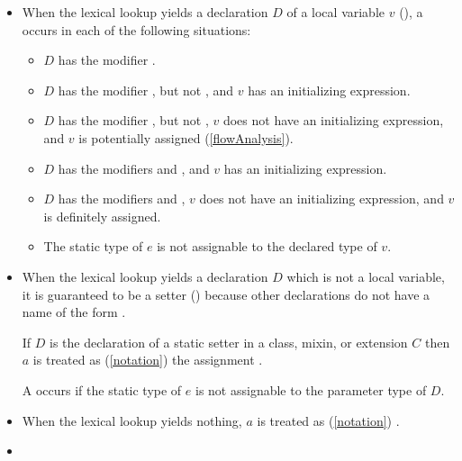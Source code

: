 \documentclass[makeidx]{article}
\begin{document}
\begin{itemize}
\item
  When the lexical lookup yields a declaration $D$ of a local variable $v$
  (),
  a  occurs in each of the following situations:
  \begin{itemize}
  \item
    $D$ has the modifier \CONST.
  \item
    $D$ has the modifier \FINAL, but not \LATE,
    and $v$ has an initializing expression.
  \item
    $D$ has the modifier \FINAL, but not \LATE,
    $v$ does not have an initializing expression,
    and $v$ is potentially assigned
    (\ref{flowAnalysis}).
  \item
    $D$ has the modifiers \LATE{} and \FINAL,
    and $v$ has an initializing expression.
  \item
    $D$ has the modifiers \LATE{} and \FINAL,
    $v$ does not have an initializing expression,
    and $v$ is definitely assigned.
  \item
    The static type of $e$ is not assignable to the declared type of $v$.
  \end{itemize}
\item
  When the lexical lookup yields a declaration $D$
  which is not a local variable,
  it is guaranteed to be a setter
  ()
  because other declarations do not have a name
  of the form \code{\id=}.

  If $D$ is the declaration of a static setter
  in a class, mixin, or extension $C$
  then $a$ is treated as
  (\ref{notation})
  the assignment .


  A  occurs
  if the static type of $e$ is not assignable to the parameter type of $D$.
\item
  When the lexical lookup yields nothing,
  $a$ is treated as
  (\ref{notation})
  .

\item
\end{itemize}
\end{document}
